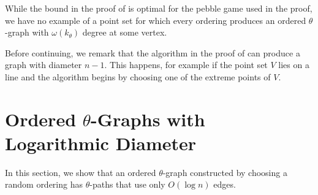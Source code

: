 \documentclass{elsart}
\begin{document}
While the bound in the proof of  is optimal for
the pebble game used in the proof, we have no example of a point set
for which every ordering produces an ordered $\theta$-graph with
$\omega(k_\theta)$ degree at some vertex.

Before continuing, we remark that the algorithm in the proof of
 can produce a graph with diameter $n-1$.  This
happens, for example if the point set $V$ lies on a line and the
algorithm begins by choosing one of the extreme points of $V$.

\section{Ordered $\theta$-Graphs with Logarithmic Diameter}

In this section, we show that an ordered $\theta$-graph constructed by
choosing a random ordering has $\theta$-paths that use only $O(\log
n)$ edges.
\end{document}
